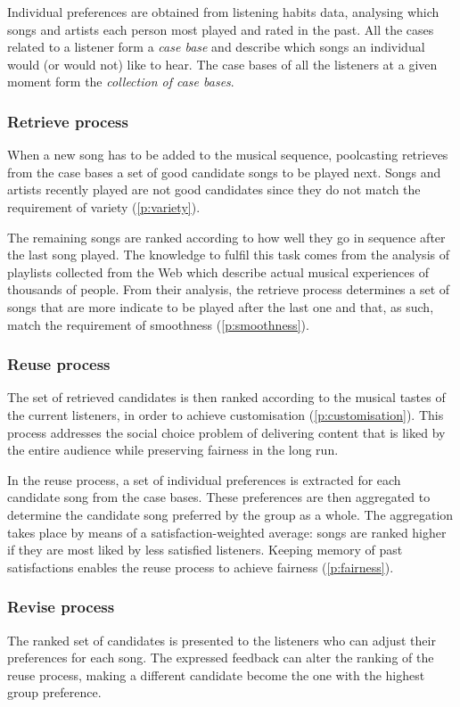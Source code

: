 Individual preferences are obtained from listening habits data, analysing which songs and artists each person most played and rated in the past.
All the cases related to a listener form a \emph{case base} and describe which songs an individual would (or would not) like to hear.
The case bases of all the listeners at a given moment form the \emph{collection of case bases}.

\subsubsection{Retrieve process} %
When a new song has to be added to the musical sequence, poolcasting retrieves from the case bases a set of good candidate songs to be played next.
Songs and artists recently played are not good candidates since they do not match the requirement of variety (\ref{p:variety}).

The remaining songs are ranked according to how well they go in sequence after the last song played.
The knowledge to fulfil this task comes from the analysis of playlists collected from the Web which describe actual musical experiences of thousands of people.
From their analysis, the retrieve process determines a set of songs that are more indicate to be played after the last one and that, as such, match the requirement of smoothness (\ref{p:smoothness}).

\subsubsection{Reuse process} %
The set of retrieved candidates is then ranked according to the musical tastes of the current listeners, in order to achieve customisation (\ref{p:customisation}).
This process addresses the social choice problem of delivering content that is liked by the entire audience while preserving fairness in the long run.

In the reuse process, a set of individual preferences is extracted for each candidate song from the case bases. These preferences are then aggregated to determine the candidate song preferred by the group as a whole.
The aggregation takes place by means of a satisfaction-weighted average: songs are ranked higher if they are most liked by less satisfied listeners.
Keeping memory of past satisfactions enables the reuse process to achieve fairness (\ref{p:fairness}).

\subsubsection{Revise process} %
The ranked set of candidates is presented to the listeners who can adjust their preferences for each song.
The expressed feedback can alter the ranking of the reuse process, making a different candidate become the one with the highest group preference.

